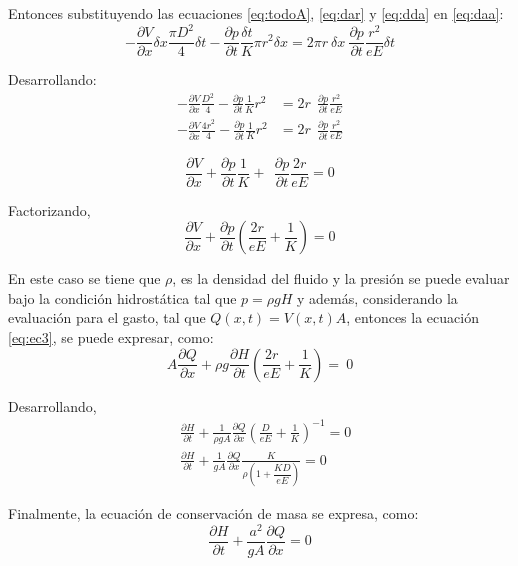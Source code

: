 \documentclass[letterpaper]{report}
\begin{document}
Entonces substituyendo las ecuaciones \ref{eq:todoA}, \ref{eq:dar}  y \ref{eq:dda} en \ref{eq:daa}:
\begin{equation*}
	-\frac{\partial V}{\partial x}\delta x\frac{\pi D^2}{4}\delta t-\frac{\partial p}{\partial t}\frac{\delta t}{K}\pi r^2\delta x=2\pi r\ \delta x\ \frac{\partial p}{\partial t}\frac{r^2}{eE}\delta t
\end{equation*}

Desarrollando:
\begin{align*}
	-\frac{\partial V}{\partial x}\frac{D^2}{4}-\frac{\partial p}{\partial t}\frac{1}{K}r^2 &=2r\ \ \frac{\partial p}{\partial t}\frac{r^2}{eE}\\
	-\frac{\partial V}{\partial x}\frac{{4r}^2}{4}-\frac{\partial p}{\partial t}\frac{1}{K}r^2 &=2r\ \ \frac{\partial p}{\partial t}\frac{r^2}{eE}
\end{align*}

\begin{equation*}
	\frac{\partial V}{\partial x}+\frac{\partial p}{\partial t}\frac{1}{K}+\ \ \frac{\partial p}{\partial t}\frac{2r}{eE}=0
\end{equation*}

Factorizando,
\begin{equation}
	\frac{\partial V}{\partial x}+\frac{\partial p}{\partial t}\left(\frac{2r}{eE}+\frac{1}{K}\right)= 0
	\label{eq:ec3}
\end{equation}

En este caso se tiene que $\rho$, es la densidad del fluido y la presión se puede evaluar bajo la condición hidrostática tal que $p=\rho gH$ y además, considerando la evaluación para el gasto, tal que $Q(x,t)=V\left(x,t\right)A$, entonces la ecuación \ref{eq:ec3}, se puede expresar, como:
\begin{equation*}
	A\frac{\partial Q}{\partial x}+\rho g\frac{\partial H}{\partial t}\left(\frac{2r}{eE}+\frac{1}{K}\right)=\ 0
\end{equation*}

Desarrollando,
\begin{align*}
	&\frac{\partial H}{\partial t}+\frac{1}{\rho gA}\frac{\partial Q}{\partial x}\left(\frac{D}{eE}+\frac{1}{K}\right)^{-1} = 0\\
	&\frac{\partial H}{\partial t}+\frac{1}{gA}\frac{\partial Q}{\partial x}\frac{K}{\rho\left(1+\dfrac{KD}{eE}\right)} = 0
\end{align*}

Finalmente, la ecuación de conservación de masa se expresa, como:
\begin{equation}
	\frac{\partial H}{\partial t}+\frac{a^2}{gA}\frac{\partial Q}{\partial x}=0
\end{equation}
\end{document}
